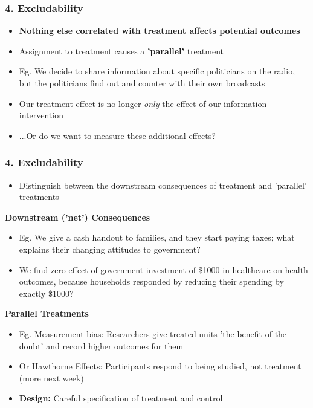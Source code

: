 \documentclass[xcolor=x11names,compress]{beamer}\usepackage[]{graphicx}\usepackage[]{color}
\renewcommand{\(}{\begin{columns}}
\renewcommand{\)}{\end{columns}}
\newcommand{\<}[1]{\begin{column}{#1}}
\renewcommand{\>}{\end{column}}
\begin{document}
\begin{frame}
\frametitle{4. Excludability}
\begin{itemize}
\item \textbf{Nothing else correlated with treatment affects potential outcomes}
\pause
\item Assignment to treatment causes a \textbf{'parallel'} treatment
\pause
\item Eg. We decide to share information about specific politicians on the radio, but the politicians find out and counter with their own broadcasts
\pause
\item Our treatment effect is no longer \textit{only} the effect of our information intervention
\pause
\item ...Or do we want to measure these additional effects?
\end{itemize}
\end{frame}

\begin{frame}
\frametitle{4. Excludability}
\begin{itemize}
\item Distinguish between the downstream consequences of treatment and 'parallel' treatments
\end{itemize}
\pause
\footnotesize
\begin{multicols}{2}
\textbf{Downstream ('net') Consequences}
\begin{itemize}
\pause
\item Eg. We give a cash handout to families, and they start paying taxes; what explains their changing attitudes to government?
\pause
\item We find zero effect of government investment of \$1000 in healthcare on health outcomes, because households responded by reducing their spending by exactly \$1000?
\end{itemize}
\columnbreak
\pause
\textbf{Parallel Treatments}
\begin{itemize}
\pause
\item Eg. Measurement bias: Researchers give treated units 'the benefit of the doubt' and record higher outcomes for them
\pause
\item Or Hawthorne Effects: Participants respond to being studied, not treatment (more next week)
\end{itemize}
\end{multicols}
\normalsize
\begin{itemize}
\item \textbf{Design:} Careful specification of treatment and control
\end{itemize}
\end{frame} 
\end{document}
